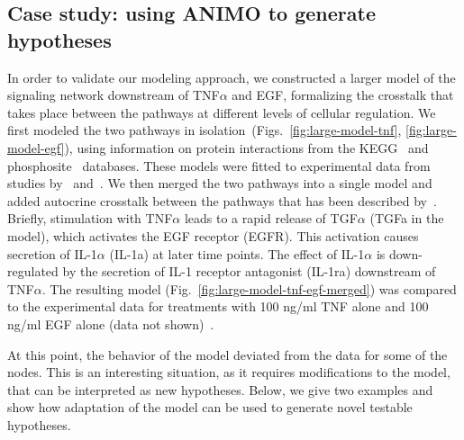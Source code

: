 \subsection{Case study: using ANIMO to generate hypotheses}\label{subsec:case-study-larger}
In order to validate our modeling approach,
we constructed a larger model of the signaling network downstream of TNF$\alpha$ and EGF, formalizing 
the crosstalk that takes place between the pathways at different levels of cellular regulation.
We first modeled the two pathways in isolation~(Figs.~\ref{fig:large-model-tnf}, \ref{fig:large-model-egf}),
using information on protein interactions from
the KEGG~\citep{kegg} and phosphosite~\citep{phosphosite} databases. These models were fitted to experimental data
from studies by~\citet{pathway-compendium} and~\citet{pathway-autocrine}.
We then merged the two pathways into a single model and added autocrine crosstalk between the pathways that has been
described by~\citet{pathway-autocrine}.
Briefly, stimulation with TNF$\alpha$ leads to a rapid release of TGF$\alpha$ ({\sf TGFa} in the model), 
which activates the EGF receptor ({\sf EGFR}).
This activation causes secretion of IL-1$\alpha$ ({\sf IL-1a}) at later time points.
The effect of IL-1$\alpha$ is down-regulated by the secretion of IL-1 receptor antagonist ({\sf IL-1ra}) 
downstream of TNF$\alpha$.
The resulting model (Fig.~\ref{fig:large-model-tnf-egf-merged}) was compared to the experimental data 
for treatments with 100 ng/ml TNF alone and 100 ng/ml EGF alone (data not shown)~\citep{pathway-compendium}.

At this point, the behavior of the model deviated from the data for some of the nodes.
This is an interesting situation, as it requires
modifications to the model, that can be interpreted as new hypotheses. Below, we give two examples and show how
adaptation of the model can be used to generate novel testable hypotheses.



